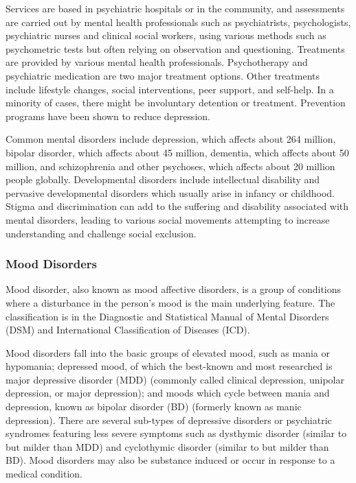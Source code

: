 Services are based in psychiatric hospitals or in the community, and
assessments are carried out by mental health professionals such as
psychiatrists, psychologists, psychiatric nurses and clinical social
workers, using various methods such as psychometric tests but often
relying on observation and questioning. Treatments are provided by
various mental health professionals. Psychotherapy and psychiatric
medication are two major treatment options. Other treatments include
lifestyle changes, social interventions, peer support, and self-help. In
a minority of cases, there might be involuntary detention or treatment.
Prevention programs have been shown to reduce depression.

Common mental disorders include depression, which affects about 264
million, bipolar disorder, which affects about 45 million, dementia,
which affects about 50 million, and schizophrenia and other psychoses,
which affects about 20 million people globally. Developmental disorders
include intellectual disability and pervasive developmental disorders
which usually arise in infancy or childhood. Stigma and discrimination
can add to the suffering and disability associated with mental
disorders, leading to various social movements attempting to increase
understanding and challenge social exclusion.

\hypertarget{mood-disorders}{%
\subsubsection{Mood Disorders}\label{mood-disorders}}

Mood disorder, also known as mood affective disorders, is a group of
conditions where a disturbance in the person's mood is the main
underlying feature. The classification is in the Diagnostic and
Statistical Manual of Mental Disorders (DSM) and International
Classification of Diseases (ICD).

Mood disorders fall into the basic groups of elevated mood, such as
mania or hypomania; depressed mood, of which the best-known and most
researched is major depressive disorder (MDD) (commonly called clinical
depression, unipolar depression, or major depression); and moods which
cycle between mania and depression, known as bipolar disorder (BD)
(formerly known as manic depression). There are several sub-types of
depressive disorders or psychiatric syndromes featuring less severe
symptoms such as dysthymic disorder (similar to but milder than MDD) and
cyclothymic disorder (similar to but milder than BD).
Mood disorders may also be substance induced or occur in response to a
medical condition.

